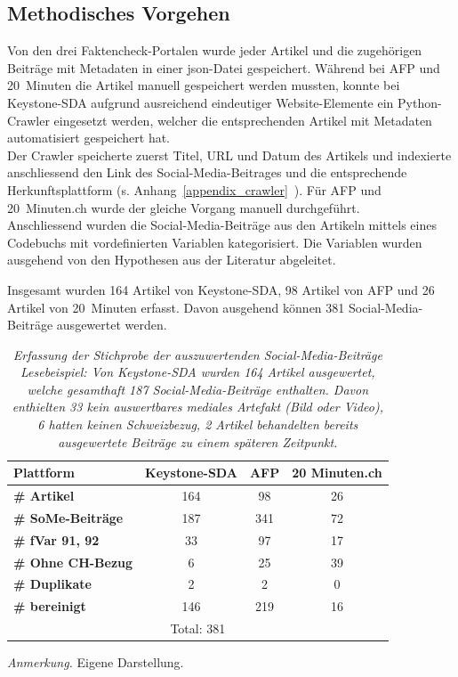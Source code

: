 \documentclass[12pt,a4paper]{article}        %
\begin{document}
\subsection{Methodisches Vorgehen}
Von den drei Faktencheck-Portalen wurde jeder Artikel und die zugehörigen Beiträge mit Metadaten in einer json-Datei gespeichert. Während bei AFP und 20 Minuten die Artikel manuell gespeichert werden mussten, konnte bei Keystone-SDA aufgrund ausreichend eindeutiger Website-Elemente ein Python-Crawler eingesetzt werden, welcher die entsprechenden Artikel mit Metadaten automatisiert gespeichert hat.\\
Der Crawler speicherte zuerst Titel, URL und Datum des Artikels und indexierte anschliessend den Link des Social-Media-Beitrages und die entsprechende Herkunftsplattform (s. Anhang~\ref{appendix_crawler}~). Für AFP und 20 Minuten.ch wurde der gleiche Vorgang manuell durchgeführt.\\
Anschliessend wurden die Social-Media-Beiträge aus den Artikeln mittels eines Codebuchs mit vordefinierten Variablen kategorisiert. Die Variablen wurden ausgehend von den Hypothesen aus der Literatur abgeleitet.

Insgesamt wurden 164 Artikel von Keystone-SDA, 98 Artikel von AFP und 26 Artikel von 20 Minuten erfasst. Davon ausgehend können 381 Social-Media-Beiträge ausgewertet werden.

\begin{table}[H]
  \caption{\textit{Erfassung der Stichprobe der auszuwertenden Social-Media-Beiträge} \\
  \textit{Lesebeispiel: Von Keystone-SDA wurden 164 Artikel ausgewertet, welche gesamthaft 187 Social-Media-Beiträge enthalten. Davon enthielten 33 kein auswertbares mediales Artefakt (Bild oder Video), 6 hatten keinen Schweizbezug, 2 Artikel behandelten bereits ausgewertete Beiträge zu einem späteren Zeitpunkt.}}
  \label{tab:method_sample}
  \centering
  \begin{tabular}{|l|c|c|c|}
    \hline
    \textbf{Plattform} & \textbf{Keystone-SDA} & \textbf{AFP} & \textbf{20 Minuten.ch} \\
    \hline
    \textbf{\# Artikel} & 164 & 98 & 26 \\
    \hline
    \textbf{\# SoMe-Beiträge} & 187 & 341 & 72 \\
    \hline
    \textbf{\# fVar 91, 92} & 33 & 97 & 17 \\
    \hline
    \textbf{\# Ohne CH-Bezug} & 6 & 25 & 39 \\
    \hline
    \textbf{\# Duplikate} & 2 & 2 & 0 \\
    \hline
    \textbf{\# bereinigt} & 146 & 219 & 16 \\
    \hline
    \multicolumn{4}{|c|}{Total: 381} \\
    \hline
  \end{tabular}
\footnotesize\textit{Anmerkung.} Eigene Darstellung.  
\end{table}
\end{document}
